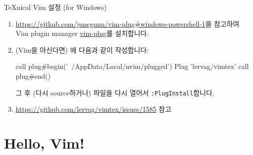 \documentclass{beamer}
\begin{document}
\begin{frame}{\TeX{}nical Vim 설정 (for Windows)}
\begin{enumerate}
    \framebreak
  \item \url{https://github.com/junegunn/vim-plug#windows-powershell-1}을
    참고하여 Vim plugin manager \href{https://github.com/junegunn/vim-plug}{vim-plug}를 설치합니다.
    \item (Vim을 아신다면) 에 다음과 같이 작성합니다:
      \begin{vimcode}
        call plug#begin('~/AppData/Local/nvim/plugged')
        Plug 'lervag/vimtex'
        call plug#end()
      \end{vimcode}
      그 후 (다시 source하거나) 파일을 다시 열어서 \verb/:PlugInstall/합니다.


    \framebreak
    \item \url{https://github.com/lervag/vimtex/issues/1585} 참고
  \end{enumerate}
\end{frame}

\section{Hello, Vim!}
\end{document}
